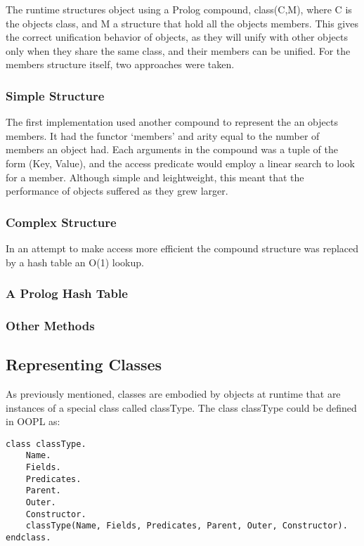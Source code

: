 \documentclass[12pt,a4paper,twoside,openright]{report}
\begin{document}
	The runtime structures object using a Prolog compound, class(C,M), where C is the objects class, and M a structure that hold all the objects members. This gives the correct unification behavior of objects, as they will unify with other objects only when they share the same class, and their members can be unified. For the members structure itself, two approaches were taken.
	
		\subsubsection{Simple Structure}
		
The first implementation used another compound to represent the an objects members. It had the functor `members' and arity equal to the number of members an object had. Each arguments in the compound was a tuple of the form (Key, Value), and the access predicate would employ a linear search to look for a member. Although simple and leightweight, this meant that the performance of objects suffered as they grew larger.

		\subsubsection{Complex Structure}
		
In an attempt to make access more efficient the compound structure was replaced by a hash table an O(1) lookup. 
		
		\subsubsection{A Prolog Hash Table}

		
		\subsubsection{Other Methods}
		

	\subsection{Representing Classes}
	
As previously mentioned, classes are embodied by objects at runtime that are instances of a special class called classType. The class classType could be defined in OOPL as:

\begin{lstlisting}
class classType.
	Name.
	Fields.
	Predicates.
	Parent.
	Outer.
	Constructor.
	classType(Name, Fields, Predicates, Parent, Outer, Constructor).
endclass.
\end{lstlisting}
\end{document}
